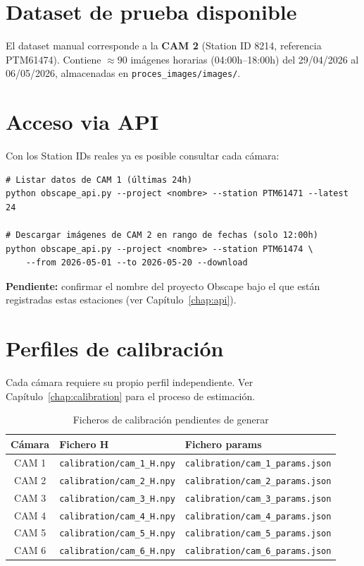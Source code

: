 \section{Dataset de prueba disponible}

El dataset manual corresponde a la \textbf{CAM 2} (Station ID 8214,
referencia PTM61474). Contiene $\approx 90$ imágenes horarias
(04:00h--18:00h) del 29/04/2026 al 06/05/2026, almacenadas en
\texttt{proces\_images/images/}.

\section{Acceso via API}

Con los Station IDs reales ya es posible consultar cada cámara:

\begin{Verbatim}
# Listar datos de CAM 1 (últimas 24h)
python obscape_api.py --project <nombre> --station PTM61471 --latest 24

# Descargar imágenes de CAM 2 en rango de fechas (solo 12:00h)
python obscape_api.py --project <nombre> --station PTM61474 \
    --from 2026-05-01 --to 2026-05-20 --download
\end{Verbatim}

\textbf{Pendiente:} confirmar el nombre del proyecto Obscape bajo el que
están registradas estas estaciones (ver Capítulo~\ref{chap:api}).

\section{Perfiles de calibración}

Cada cámara requiere su propio perfil independiente. Ver
Capítulo~\ref{chap:calibration} para el proceso de estimación.

\begin{table}[h!]
\centering
\begin{tabular}{cll}
\toprule
\textbf{Cámara} & \textbf{Fichero H} & \textbf{Fichero params} \\
\midrule
CAM 1 & \texttt{calibration/cam\_1\_H.npy} & \texttt{calibration/cam\_1\_params.json} \\
CAM 2 & \texttt{calibration/cam\_2\_H.npy} & \texttt{calibration/cam\_2\_params.json} \\
CAM 3 & \texttt{calibration/cam\_3\_H.npy} & \texttt{calibration/cam\_3\_params.json} \\
CAM 4 & \texttt{calibration/cam\_4\_H.npy} & \texttt{calibration/cam\_4\_params.json} \\
CAM 5 & \texttt{calibration/cam\_5\_H.npy} & \texttt{calibration/cam\_5\_params.json} \\
CAM 6 & \texttt{calibration/cam\_6\_H.npy} & \texttt{calibration/cam\_6\_params.json} \\
\bottomrule
\end{tabular}
\caption{Ficheros de calibración pendientes de generar}
\end{table}
